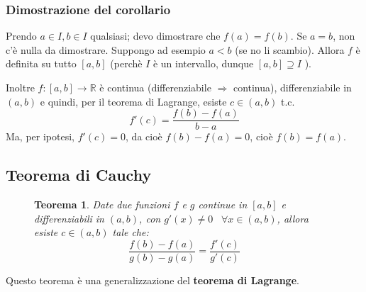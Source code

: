 \documentclass[a4paper]{article}
\newtheorem{theorem}{Teorema}
\theoremstyle{break}
\theoremstyle{break}
\theoremstyle{break}
\theoremstyle{break}
\begin{document}
\subsubsection{Dimostrazione del corollario}
Prendo \( a \in I, b \in I \) qualsiasi; devo dimostrare che \( f(a) = f(b) \).
Se \( a = b \), non c'è nulla da dimostrare. Suppongo ad esempio \( a < b \) (se no li scambio).
Allora \( f \) è definita su tutto \( [a,b] \) (perchè \( I \) è un intervallo, dunque \( [a,b] \supseteq I\) ).
\begin{figure}[H]
  \begin{center}
  \end{center}
\end{figure}
Inoltre \( f:[a,b] \to \mathbb{R} \) è continua (differenziabile \( \Rightarrow \) continua),
differenziabile in \( (a,b) \) e quindi, per il teorema di Lagrange, esiste \( c \in (a,b) \) t.c.
\[
  f'(c)=\frac{f(b)-f(a)}{b-a}
\] 
Ma, per ipotesi, \( f'(c)=0 \), da cioè \( f(b)-f(a)=0 \), cioè \( f(b)=f(a) \).

\subsection{Teorema di Cauchy}
\begin{figure}[H]
  \begin{theorem}
    Date due funzioni \( f \) e \( g \) continue in \( [a,b] \) e differenziabili in \( (a,b) \),
    con \( g'(x) \neq 0 \;\;\; \forall x \in (a,b) \), allora esiste \( c \in (a,b) \) tale che:
    \[
      \frac{f(b) - f(a)}{g(b) - g(a)} = \frac{f'(c)}{g'(c)}
    \]
  \end{theorem}
\end{figure}
Questo teorema è una generalizzazione del \textbf{teorema di Lagrange}.
\end{document}
